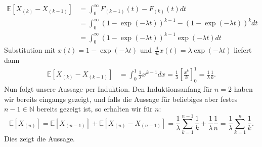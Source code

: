 \documentclass[a4paper]{article}
\begin{document}
\begin{enumerate}
\begin{align*}
		      \mathds{E}[X_{(k)} - X_{(k-1)}] & = \int_{0}^{\infty} F_{(k-1)}(t) - F_{(k)}(t) dt                               \\
		                                      & = \int_{0}^{\infty} (1 - \exp(-\lambda t))^{k-1} - (1 - \exp(-\lambda t))^k dt \\
		                                      & = \int_{0}^{\infty} (1 - \exp(-\lambda t))^{k-1} \exp(-\lambda t) dt
	      \end{align*}
	      Substitution mit $x(t) = 1 - \exp(-\lambda t)$ und $\frac{d}{dt}x(t) = \lambda \exp(- \lambda t)$ liefert dann
	      \begin{align*}
		      \mathds{E}[X_{(k)} - X_{(k-1)}] & = \int_{0}^{1} \frac{1}{\lambda} x^{k-1} dx = \frac{1}{\lambda} \left[ \frac{x^k}{k} \right]_0^1 = \frac{1}{\lambda} \frac{1}{k}\text{.}
	      \end{align*}
	      Nun folgt unsere Aussage per Induktion. Den Induktionsanfang für $n = 2$ haben wir bereits eingangs gezeigt, und falls die Aussage für beliebiges aber festes $n-1 \in \mathds{N}$ bereits gezeigt ist, so erhalten wir für $n$:
	      \begin{equation*}
		      \mathds{E}[X_{(n)}] = \mathds{E}[X_{(n-1)}] + \mathds{E}[X_{(n)} - X_{(n-1)}] = \frac{1}{\lambda} \sum_{k =1 }^{n-1} \frac{1}{k} + \frac{1}{\lambda} \frac{1}{n} = \frac{1}{\lambda} \sum_{k =1 }^{n} \frac{1}{k}\text{.}
	      \end{equation*}
	      Dies zeigt die Aussage.
\end{enumerate}

\subsection{}
\end{document}
